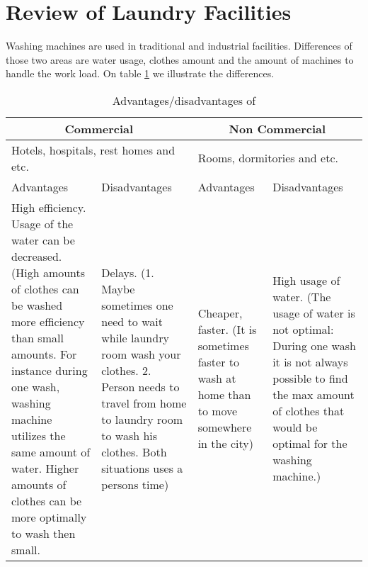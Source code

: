 \section{Review of Laundry Facilities}
Washing machines are used in traditional and industrial facilities. Differences of those two areas are water usage, clothes amount and the amount of machines to handle the work load. On table \ref{tab:AdDis} we illustrate the differences.

\begin{table}[h]
	\centering
    \begin{tabular}{ | p{3.5cm} | p{3.5cm} | p{3.5cm} | p{3.5cm} |}
    \hline
    \multicolumn{2}{|c|}{\textbf{Commercial}} & \multicolumn{2}{|c|}{\textbf{Non Commercial}} \\ \hline
    \multicolumn{2}{|l|}{Hotels, hospitals, rest homes and etc.} & \multicolumn{2}{|l|}{Rooms, dormitories and etc.} \\ \hline
    Advantages & Disadvantages & Advantages & Disadvantages \\ \hline
    High efficiency. Usage of the water can be decreased. (High amounts of clothes can be washed more efficiency than small amounts. For instance during one wash, washing machine utilizes the same amount of water. Higher amounts of clothes can be more optimally to wash then small. & Delays. (1. Maybe sometimes one need to wait while laundry room wash your clothes. 2. Person needs to travel from home to laundry room to wash his clothes. Both situations uses a persons time) & Cheaper, faster. (It is sometimes faster to wash at home than to move somewhere in the city) & High usage of water. (The usage of water is not optimal: During one wash it is not always possible to find the max amount of clothes that would be optimal for the washing machine.) \\ \hline
    \end{tabular}
	\caption{Advantages/disadvantages of }
	\label{tab:AdDis}
\end{table}